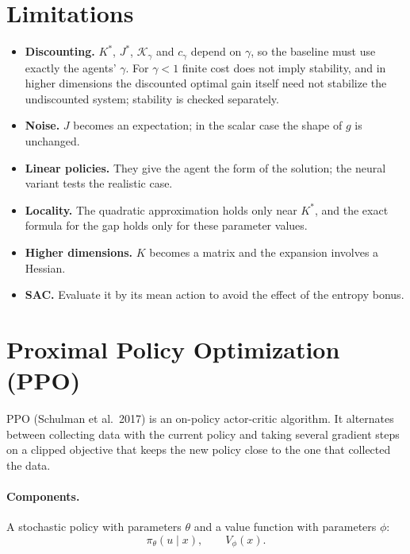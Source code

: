 \documentclass[11pt]{article}
\begin{document}
\section{Limitations}
\label{sec:limitations}

\begin{itemize}[leftmargin=*]
  \item \textbf{Discounting.} $K^*$, $J^*$, $\mathcal{K}_\gamma$ and $c_\gamma$ depend on $\gamma$,
    so the baseline must use exactly the agents' $\gamma$. For $\gamma < 1$ finite cost does not
    imply stability, and in higher dimensions the discounted optimal gain itself need not stabilize
    the undiscounted system; stability is checked separately.
  \item \textbf{Noise.} $J$ becomes an expectation; in the scalar case the shape of $g$ is unchanged.
  \item \textbf{Linear policies.} They give the agent the form of the solution; the neural variant
    tests the realistic case.
  \item \textbf{Locality.} The quadratic approximation holds only near $K^*$, and the exact formula
    for the gap holds only for these parameter values.
  \item \textbf{Higher dimensions.} $K$ becomes a matrix and the expansion involves a Hessian.
  \item \textbf{SAC.} Evaluate it by its mean action to avoid the effect of the entropy bonus.
\end{itemize}

\appendix

\section{Proximal Policy Optimization (PPO)}

PPO (Schulman et al.\ 2017) is an on-policy actor-critic algorithm. It alternates between collecting
data with the current policy and taking several gradient steps on a clipped objective that keeps the
new policy close to the one that collected the data.

\paragraph{Components.} A stochastic policy with parameters $\theta$ and a value function with
parameters $\phi$:
\[
  \pi_\theta(u \mid x), \qquad V_\phi(x) .
\]
\end{document}

